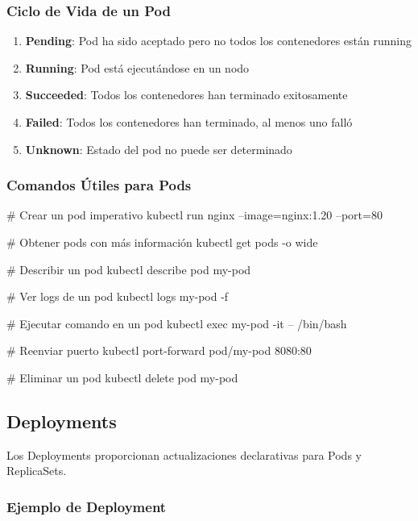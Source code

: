 \documentclass[11pt,a4paper]{article}
\begin{document}
\subsubsection{Ciclo de Vida de un Pod}

\begin{enumerate}
    \item \textbf{\textcolor{k8sblue}{Pending}}: Pod ha sido aceptado pero no todos los contenedores están running
    \item \textbf{\textcolor{k8ssuccess}{Running}}: Pod está ejecutándose en un nodo
    \item \textbf{\textcolor{k8swarning}{Succeeded}}: Todos los contenedores han terminado exitosamente
    \item \textbf{\textcolor{k8serror}{Failed}}: Todos los contenedores han terminado, al menos uno falló
    \item \textbf{\textcolor{k8ssteelblue}{Unknown}}: Estado del pod no puede ser determinado
\end{enumerate}

\subsubsection{Comandos Útiles para Pods}

\begin{commandbox}
\# Crear un pod imperativo
kubectl run nginx --image=nginx:1.20 --port=80

\# Obtener pods con más información
kubectl get pods -o wide

\# Describir un pod
kubectl describe pod my-pod

\# Ver logs de un pod
kubectl logs my-pod -f

\# Ejecutar comando en un pod
kubectl exec my-pod -it -- /bin/bash

\# Reenviar puerto
kubectl port-forward pod/my-pod 8080:80

\# Eliminar un pod
kubectl delete pod my-pod
\end{commandbox}

\subsection{Deployments}

Los Deployments proporcionan actualizaciones declarativas para Pods y ReplicaSets.

\subsubsection{Ejemplo de Deployment}
\end{document}
